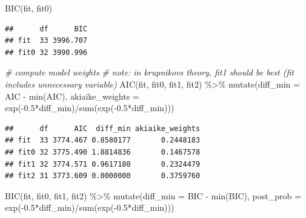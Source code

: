 \documentclass[
]{book}
\newenvironment{Shaded}{\begin{snugshade}}{\end{snugshade}}
\newcommand{\AttributeTok}[1]{\textcolor[rgb]{0.77,0.63,0.00}{#1}}
\newcommand{\CommentTok}[1]{\textcolor[rgb]{0.56,0.35,0.01}{\textit{#1}}}
\newcommand{\FloatTok}[1]{\textcolor[rgb]{0.00,0.00,0.81}{#1}}
\newcommand{\FunctionTok}[1]{\textcolor[rgb]{0.00,0.00,0.00}{#1}}
\newcommand{\NormalTok}[1]{#1}
\newcommand{\SpecialCharTok}[1]{\textcolor[rgb]{0.00,0.00,0.00}{#1}}
\begin{document}
\begin{Shaded}
\begin{Highlighting}[]
\FunctionTok{BIC}\NormalTok{(fit, fit0)}
\end{Highlighting}
\end{Shaded}

\begin{verbatim}
##      df      BIC
## fit  33 3996.707
## fit0 32 3990.996
\end{verbatim}

\begin{Shaded}
\begin{Highlighting}[]
\CommentTok{\# compute model weights}
\CommentTok{\# note: in krupnikov\textquotesingle{}s theory, fit1 should be best (fit includes unnecessary variable)}
\FunctionTok{AIC}\NormalTok{(fit, fit0, fit1, fit2) }\SpecialCharTok{\%\textgreater{}\%}
  \FunctionTok{mutate}\NormalTok{(}\AttributeTok{diff\_min =}\NormalTok{ AIC }\SpecialCharTok{{-}} \FunctionTok{min}\NormalTok{(AIC),}
         \AttributeTok{akiaike\_weights =} \FunctionTok{exp}\NormalTok{(}\SpecialCharTok{{-}}\FloatTok{0.5}\SpecialCharTok{*}\NormalTok{diff\_min)}\SpecialCharTok{/}\FunctionTok{sum}\NormalTok{(}\FunctionTok{exp}\NormalTok{(}\SpecialCharTok{{-}}\FloatTok{0.5}\SpecialCharTok{*}\NormalTok{diff\_min)))}
\end{Highlighting}
\end{Shaded}

\begin{verbatim}
##      df      AIC  diff_min akiaike_weights
## fit  33 3774.467 0.8580177       0.2448183
## fit0 32 3775.490 1.8814836       0.1467578
## fit1 32 3774.571 0.9617180       0.2324479
## fit2 31 3773.609 0.0000000       0.3759760
\end{verbatim}

\begin{Shaded}
\begin{Highlighting}[]
\FunctionTok{BIC}\NormalTok{(fit, fit0, fit1, fit2) }\SpecialCharTok{\%\textgreater{}\%}
  \FunctionTok{mutate}\NormalTok{(}\AttributeTok{diff\_min =}\NormalTok{ BIC }\SpecialCharTok{{-}} \FunctionTok{min}\NormalTok{(BIC),}
         \AttributeTok{post\_prob =} \FunctionTok{exp}\NormalTok{(}\SpecialCharTok{{-}}\FloatTok{0.5}\SpecialCharTok{*}\NormalTok{diff\_min)}\SpecialCharTok{/}\FunctionTok{sum}\NormalTok{(}\FunctionTok{exp}\NormalTok{(}\SpecialCharTok{{-}}\FloatTok{0.5}\SpecialCharTok{*}\NormalTok{diff\_min)))}
\end{Highlighting}
\end{Shaded}
\end{document}
